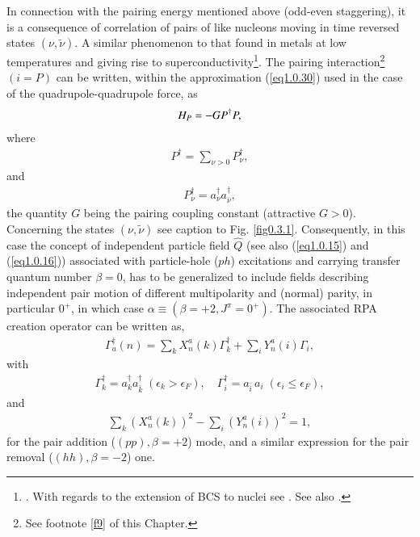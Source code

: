 In connection with the pairing energy mentioned above (odd-even staggering),  it is a consequence of correlation of pairs of like nucleons moving in  time reversed states $(\nu,\tilde \nu)$. A similar phenomenon to that found in metals at low temperatures and giving rise to superconductivity\footnote{\cite{Bardeen:57a,Bardeen:57b}. With regards to the extension of BCS to nuclei see \cite{Bohr:58}. See also \cite{Broglia:13}.}. The pairing interaction\footnote{See footnote \ref{f9} of this Chapter.} $(i=P)$ can be written, within the approximation (\ref{eq1.0.30}) used in the case of the quadrupole-quadrupole force, as 
\begin{align}\label{eq1.0.32}
H_P=- GP^\dagger P,\idx{Pairing vibrations!RPA relations}
\end{align}
where
\begin{align}\label{eq1.3.5}
P^\dagger=\sum_{\nu>0}P^\dagger_\nu,
\end{align}
  and
\begin{align}\label{eq1.0.33}
 P^\dagger_\nu=a^\dagger_\nu a^\dagger_{\bar\nu},
\end{align}
the quantity  $G$ being the pairing coupling constant (attractive $G>0$). Concerning the states $(\nu,\tilde\nu)$ see caption to Fig. \ref{fig0.3.1}.
Consequently, in this case the concept of independent particle field $\hat Q$ (see also (\ref{eq1.0.15}) and (\ref{eq1.0.16})) associated with particle-hole ($ph$) excitations and carrying transfer quantum number $\beta=0$, has to be generalized to include fields describing independent pair motion of different multipolarity and (normal) parity, in particular $0^+$, in which case $\alpha\equiv(\beta=+2,J^\pi=0^+)$. The associated RPA creation operator can be written as, 
\begin{align}\label{eq1.0.34}
\Gamma_a^\dagger(n)=\sum_k X_n^a(k)\Gamma_k^\dagger+\sum_iY^a_n(i)\Gamma_i,
\end{align}
with 
\begin{align}\label{eq1.0.35}
\Gamma^\dagger_k=a^\dagger_ka^\dagger_{\bar k}\;(\epsilon_k>\epsilon_F),\quad \Gamma^\dagger_i=a_{\bar i}\,a_i\;(\epsilon_i\leq\epsilon_F),
\end{align}
and
\begin{align}\label{eq1.0.36}
\sum_k\left(X_{n}^{a}(k)\right)^2-\sum_i \left(Y_{n}^{a}(i)\right)^2=1,
\end{align}
for the pair addition ($(pp),\beta=+2$) mode, and a similar expression for the pair removal ($(hh),\beta=-2$) one.

